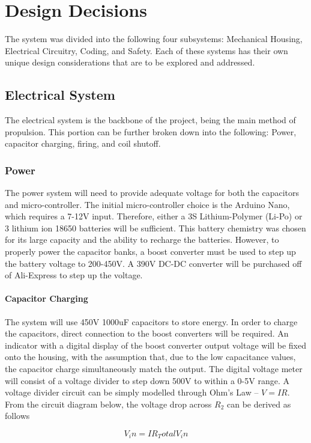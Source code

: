 \chapter{Design Decisions}
The system was divided into the following four subsystems: Mechanical Housing, Electrical Circuitry, Coding, and Safety. Each of these systems has their own unique design considerations that are to be explored and addressed.

\section{Electrical System}

The electrical system is the backbone of the project, being the main method of propulsion. This portion can be further broken down into the following: Power, capacitor charging, firing, and coil shutoff.

\subsection{Power}

The power system will need to provide adequate voltage for both the capacitors and micro-controller. The initial micro-controller choice is the Arduino Nano, which requires a 7-12V input. Therefore, either a 3S Lithium-Polymer (Li-Po) or 3 lithium ion 18650 batteries will be sufficient. This battery chemistry was chosen for its large capacity and the ability to recharge the batteries. However, to properly power the capacitor banks, a boost converter must be used to step up the battery voltage to 200-450V. A 390V DC-DC converter will be purchased off of Ali-Express to step up the voltage.

\subsubsection{Capacitor Charging}

The system will use 450V 1000uF capacitors to store energy. In order to charge the capacitors, direct connection to the boost converters will be required. An indicator with a digital display of the boost converter output voltage will be fixed onto the housing, with the assumption that, due to the low capacitance values, the capacitor charge simultaneously match the output. The digital voltage meter will consist of a voltage divider to step down 500V to within a 0-5V range. A voltage divider circuit can be simply modelled through Ohm's Law -- \(V=IR\). From the circuit diagram below, the voltage drop across \(R_2\) can be derived as follows

\begin{equation}
	V_in=IR_Total
	V_in
\end{equation}
 